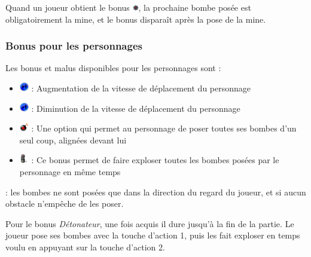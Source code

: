 \vspace{0.3cm}

Quand un joueur obtient le bonus \includegraphics[width=10px,height=10px]{images/mineBonus.png}, la prochaine bombe posée est obligatoirement la mine, et le bonus disparaît après la pose de la mine.

\subsubsection{Bonus pour les personnages}

Les bonus et malus disponibles pour les personnages sont :
\begin{itemize}
\item[] \includegraphics[width=15px,height=15px]{images/vitesseMore.png} : Augmentation de la vitesse de déplacement du personnage
\item[] \includegraphics[width=15px,height=15px]{images/vitesseLess.png} : Diminution de la vitesse de déplacement du personnage
\item[] \includegraphics[width=15px,height=15px]{images/bombLine.png} : Une option qui permet au personnage de poser toutes ses bombes d'un seul coup, alignées devant lui
\item[] \includegraphics[width=15px,height=15px]{images/remote.png} : Ce bonus permet de faire exploser toutes les bombes posées par le personnage en même temps
\end{itemize}

\vspace{0.3cm}

 : les bombes ne sont posées que dans la direction du regard du joueur, et si aucun obstacle n'empêche de les poser. 

Pour le bonus \textit{Détonateur}, une fois acquis il dure jusqu'à la fin de la partie. Le joueur pose ses bombes avec la touche d'action 1, puis les fait exploser en temps voulu en appuyant sur la touche d'action 2.

